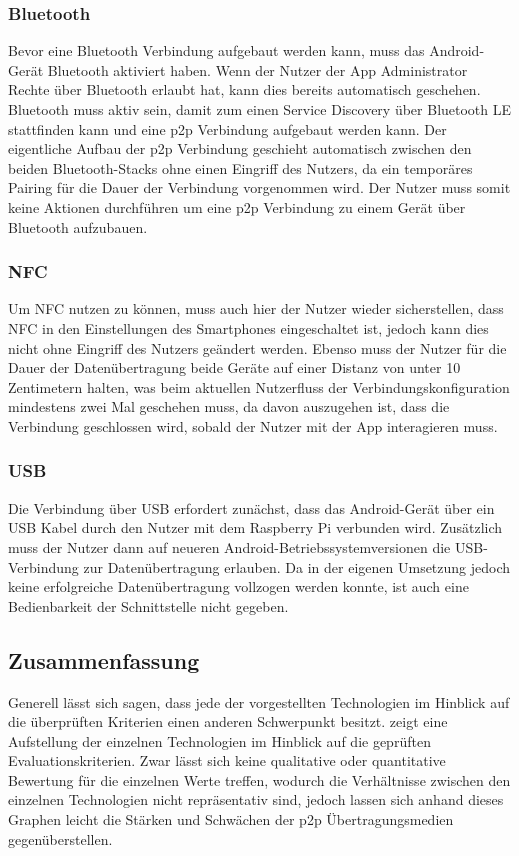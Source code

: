 		\subsubsection{Bluetooth} Bevor eine Bluetooth Verbindung aufgebaut werden kann, muss das Android-Gerät Bluetooth aktiviert haben. Wenn der Nutzer der App Administrator Rechte über Bluetooth erlaubt hat, kann dies bereits automatisch geschehen. Bluetooth muss aktiv sein, damit zum einen Service Discovery über Bluetooth LE stattfinden kann und eine p2p Verbindung aufgebaut werden kann. Der eigentliche Aufbau der p2p Verbindung geschieht automatisch zwischen den beiden Bluetooth-Stacks ohne einen Eingriff des Nutzers, da  ein temporäres Pairing für die Dauer der Verbindung vorgenommen wird. Der Nutzer muss somit keine Aktionen durchführen um eine p2p Verbindung zu einem Gerät über Bluetooth aufzubauen.
		
		\subsubsection{NFC} Um NFC nutzen zu können, muss auch hier der Nutzer wieder sicherstellen, dass NFC in den Einstellungen des Smartphones eingeschaltet ist, jedoch kann dies nicht ohne Eingriff des Nutzers geändert werden. Ebenso muss der Nutzer für die Dauer der Datenübertragung beide Geräte auf einer Distanz von unter 10 Zentimetern halten, was beim aktuellen Nutzerfluss der Verbindungskonfiguration mindestens zwei Mal geschehen muss, da davon auszugehen ist, dass die Verbindung geschlossen wird, sobald der Nutzer mit der App interagieren muss.
		
           \subsubsection{USB} Die Verbindung über USB erfordert zunächst, dass das Android-Gerät über ein USB Kabel durch den Nutzer mit dem Raspberry Pi verbunden wird. Zusätzlich muss der Nutzer dann auf neueren Android-Betriebssystemversionen die USB-Verbindung zur Datenübertragung erlauben. Da in der eigenen Umsetzung jedoch keine erfolgreiche Datenübertragung vollzogen werden konnte, ist auch eine Bedienbarkeit der Schnittstelle nicht gegeben.
		
		\subsection{Zusammenfassung}
		Generell lässt sich sagen, dass jede der vorgestellten Technologien im Hinblick auf die überprüften Kriterien einen anderen Schwerpunkt besitzt.  zeigt eine Aufstellung der einzelnen Technologien im Hinblick auf die geprüften Evaluationskriterien. Zwar lässt sich keine qualitative oder quantitative Bewertung für die einzelnen Werte treffen, wodurch die Verhältnisse zwischen den einzelnen Technologien nicht repräsentativ sind, jedoch lassen sich anhand dieses Graphen leicht die Stärken und Schwächen der p2p Übertragungsmedien gegenüberstellen.
		
